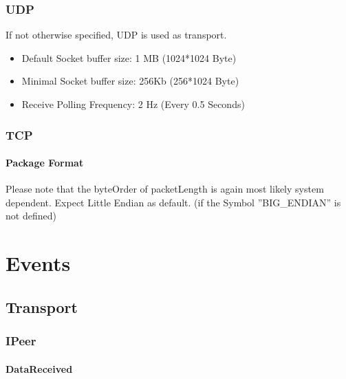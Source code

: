 \subsection{UDP}
If not otherwise specified, UDP is used as transport.

\begin{itemize}
	\item Default Socket buffer size: 1 MB (1024*1024 Byte)
	\item Minimal Socket buffer size: 256Kb (256*1024 Byte)
	\item Receive Polling Frequency: 2 Hz (Every 0.5 Seconds)
\end{itemize}

\subsection{TCP}

\subsubsection{Package Format}

\begin{messagedef}
\end{messagedef}

Please note that the byteOrder of packetLength is again most likely system dependent. Expect Little Endian as default. (if the Symbol ''BIG\_ENDIAN'' is not defined)

\chapter{Events}

\section{Transport}

\subsection{IPeer}
\subsubsection{DataReceived}
\begin{messagedef}
\end{messagedef}


